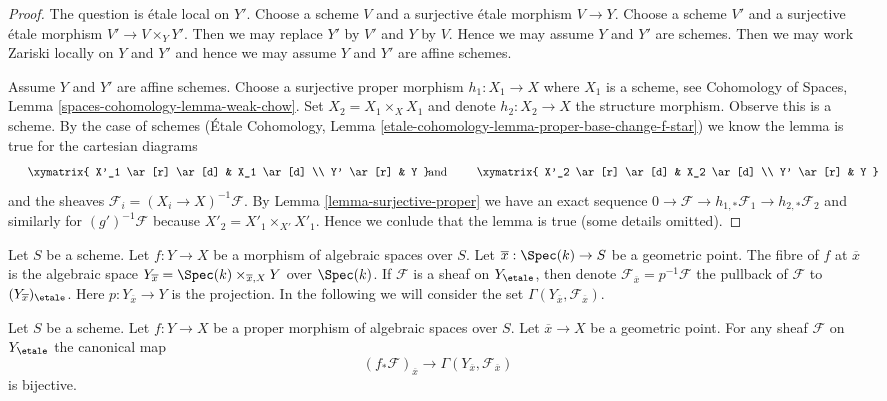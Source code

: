 \begin{proof}
The question is \'etale local on $Y'$. Choose a scheme $V$ and a surjective
\'etale morphism $V \to Y$. Choose a scheme $V'$ and a surjective \'etale
morphism $V' \to V \times_Y Y'$. Then we may replace $Y'$ by $V'$ and
$Y$ by $V$. Hence we may assume $Y$ and $Y'$ are schemes.
Then we may work Zariski locally on $Y$ and $Y'$ and hence we may
assume $Y$ and $Y'$ are affine schemes.

\medskip\noindent
Assume $Y$ and $Y'$ are affine schemes. Choose a surjective proper morphism
$h_1 : X_1 \to X$ where $X_1$ is a scheme, see
Cohomology of Spaces, Lemma \ref{spaces-cohomology-lemma-weak-chow}.
Set $X_2 = X_1 \times_X X_1$ and denote
$h_2 : X_2 \to X$ the structure morphism. Observe this is a scheme.
By the case of schemes
(\'Etale Cohomology, Lemma
\ref{etale-cohomology-lemma-proper-base-change-f-star})
we know the lemma is true for the cartesian diagrams
$$
\vcenter{
\xymatrix{
X'_1 \ar[r] \ar[d] & X_1 \ar[d] \\
Y' \ar[r] & Y
}
}
\quad\text{and}\quad
\vcenter{
\xymatrix{
X'_2 \ar[r] \ar[d] & X_2 \ar[d] \\
Y' \ar[r] & Y
}
}
$$
and the sheaves $\mathcal{F}_i = (X_i \to X)^{-1}\mathcal{F}$.
By Lemma \ref{lemma-surjective-proper} we have an exact sequence
$0 \to \mathcal{F} \to h_{1, *}\mathcal{F}_1 \to h_{2, *}\mathcal{F}_2$
and similarly for $(g')^{-1}\mathcal{F}$ because
$X'_2 = X'_1 \times_{X'} X'_1$. Hence we conlude that the
lemma is true (some details omitted).
\end{proof}

\noindent
Let $S$ be a scheme.
Let $f : Y \to X$ be a morphism of algebraic spaces over $S$. Let
$\overline{x} : \Spec(k) \to S$ be a geometric point. The fibre
of $f$ at $\overline{x}$ is the algebraic space
$Y_{\overline{x}} = \Spec(k) \times_{\overline{x}, X} Y$ over $\Spec(k)$.
If $\mathcal{F}$ is a sheaf on $Y_\etale$, then denote
$\mathcal{F}_{\overline{x}} = p^{-1}\mathcal{F}$
the pullback of $\mathcal{F}$ to $(Y_{\overline{x}})_\etale$.
Here $p : Y_{\overline{x}} \to Y$ is the projection.
In the following we will consider the set
$\Gamma(Y_{\overline{x}}, \mathcal{F}_{\overline{x}})$.

\begin{lemma}
\label{lemma-proper-pushforward-stalk}
Let $S$ be a scheme.
Let $f : Y \to X$ be a proper morphism of algebraic spaces over $S$. Let
$\overline{x} \to X$ be a geometric point.
For any sheaf $\mathcal{F}$ on $Y_\etale$
the canonical map
$$
(f_*\mathcal{F})_{\overline{x}} \longrightarrow
\Gamma(Y_{\overline{x}}, \mathcal{F}_{\overline{x}})
$$
is bijective.
\end{lemma}

